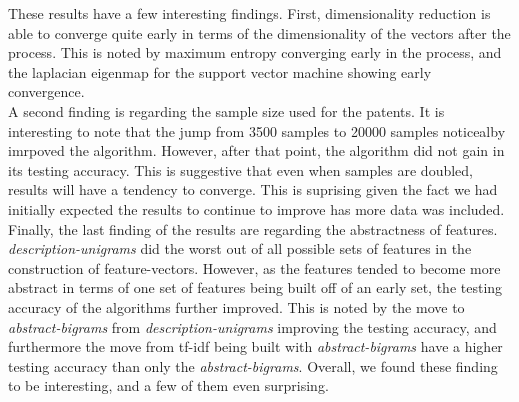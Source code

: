 These results have a few interesting findings.  First, dimensionality reduction is able to converge quite early in terms of the dimensionality of the vectors after the process.  This is noted by maximum entropy converging early in the process, and the laplacian eigenmap for the support vector machine showing early convergence.  
\\A second finding is regarding the sample size used for the patents.  It is interesting to note that the jump from 3500 samples to 20000 samples noticealby imrpoved the algorithm.  However, after that point, the algorithm did not gain in its testing accuracy.  This is suggestive that even when samples are doubled, results will have a tendency to converge.  This is suprising given the fact we had initially expected the results to continue to improve has more data was included.
\\Finally, the last finding of the results are regarding the abstractness of features.  \emph{description-unigrams} did the worst out of all possible sets of features in the construction of feature-vectors.  However, as the features tended to become more abstract in terms of one set of features being built off of an early set, the testing accuracy of the algorithms further improved.  This is noted by the move to \emph{abstract-bigrams} from \emph{description-unigrams} improving the testing accuracy, and furthermore the move from tf-idf being built with \emph{abstract-bigrams} have a higher testing accuracy than only the \emph{abstract-bigrams}. Overall, we found these finding to be interesting, and a few of them even surprising.